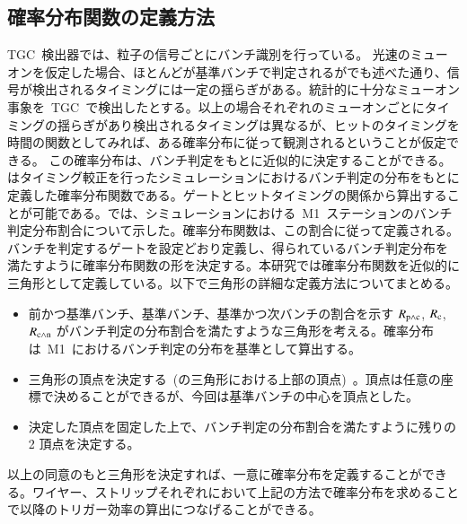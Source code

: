 \subsection{確率分布関数の定義方法}\label{sec:pro}
TGC~検出器では、粒子の信号ごとにバンチ識別を行っている。
光速のミューオンを仮定した場合、ほとんどが基準バンチで判定されるがでも述べた通り、信号が検出されるタイミングには一定の揺らぎがある。統計的に十分なミューオン事象を~TGC~で検出したとする。以上の場合それぞれのミューオンごとにタイミングの揺らぎがあり検出されるタイミングは異なるが、ヒットのタイミングを時間の関数としてみれば、ある確率分布に従って観測されるということが仮定できる。
この確率分布は、バンチ判定をもとに近似的に決定することができる。はタイミング較正を行ったシミュレーションにおけるバンチ判定の分布をもとに定義した確率分布関数である。ゲートとヒットタイミングの関係から算出することが可能である。では、シミュレーションにおける~M1~ステーションのバンチ判定分布割合について示した。確率分布関数は、この割合に従って定義される。バンチを判定するゲートを設定どおり定義し、得られているバンチ判定分布を満たすように確率分布関数の形を決定する。本研究では確率分布関数を近似的に三角形として定義している。以下で三角形の詳細な定義方法についてまとめる。
\begin{itemize}
\item 前かつ基準バンチ、基準バンチ、基準かつ次バンチの割合を示す $\it{R}_{\rm{p{\land}c}}$, $\it{R}_{\rm{c}}$, $\it{R}_{\rm{c{\land}n}}$ がバンチ判定の分布割合を満たすような三角形を考える。確率分布は~M1~におけるバンチ判定の分布を基準として算出する。
\item 三角形の頂点を決定する~(の三角形における上部の頂点)~。頂点は任意の座標で決めることができるが、今回は基準バンチの中心を頂点とした。
\item 決定した頂点を固定した上で、バンチ判定の分布割合を満たすように残りの 2 頂点を決定する。
\end{itemize}
以上の同意のもと三角形を決定すれば、一意に確率分布を定義することができる。ワイヤー、ストリップそれぞれにおいて上記の方法で確率分布を求めることで以降のトリガー効率の算出につなげることができる。

